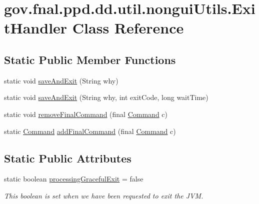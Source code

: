 \hypertarget{classgov_1_1fnal_1_1ppd_1_1dd_1_1util_1_1nonguiUtils_1_1ExitHandler}{\section{gov.\-fnal.\-ppd.\-dd.\-util.\-nongui\-Utils.\-Exit\-Handler Class Reference}
\label{classgov_1_1fnal_1_1ppd_1_1dd_1_1util_1_1nonguiUtils_1_1ExitHandler}
}
\subsection*{Static Public Member Functions}
\begin{DoxyCompactItemize}
\item 
static void \hyperlink{classgov_1_1fnal_1_1ppd_1_1dd_1_1util_1_1nonguiUtils_1_1ExitHandler_a27e7e4bcb97555bf97af048202206e23}{save\-And\-Exit} (String why)
\item 
static void \hyperlink{classgov_1_1fnal_1_1ppd_1_1dd_1_1util_1_1nonguiUtils_1_1ExitHandler_a5379acd2ff353d389bceb772a08f38d3}{save\-And\-Exit} (String why, int exit\-Code, long wait\-Time)
\item 
static void \hyperlink{classgov_1_1fnal_1_1ppd_1_1dd_1_1util_1_1nonguiUtils_1_1ExitHandler_a7869ffc2150941cbeced332cdf57df3a}{remove\-Final\-Command} (final \hyperlink{interfacegov_1_1fnal_1_1ppd_1_1dd_1_1util_1_1nonguiUtils_1_1Command}{Command} c)
\item 
static \hyperlink{interfacegov_1_1fnal_1_1ppd_1_1dd_1_1util_1_1nonguiUtils_1_1Command}{Command} \hyperlink{classgov_1_1fnal_1_1ppd_1_1dd_1_1util_1_1nonguiUtils_1_1ExitHandler_acc32a4382054c480091b42cbf3055594}{add\-Final\-Command} (final \hyperlink{interfacegov_1_1fnal_1_1ppd_1_1dd_1_1util_1_1nonguiUtils_1_1Command}{Command} c)
\end{DoxyCompactItemize}
\subsection*{Static Public Attributes}
\begin{DoxyCompactItemize}
\item 
static boolean \hyperlink{classgov_1_1fnal_1_1ppd_1_1dd_1_1util_1_1nonguiUtils_1_1ExitHandler_ae8ba4587d3eaadd9e6198b07948afec9}{processing\-Graceful\-Exit} = false
\begin{DoxyCompactList}\small\item\em This boolean is set when we have been requested to exit the J\-V\-M. \end{DoxyCompactList}\end{DoxyCompactItemize}


